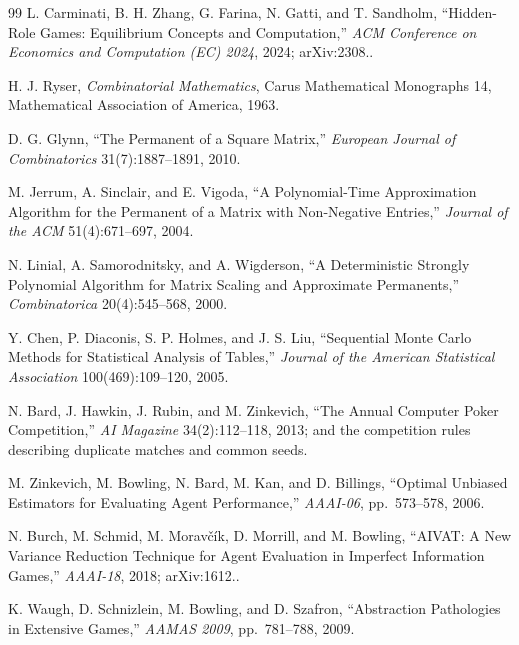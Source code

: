 \begin{thebibliography}{99}
L. Carminati, B. H. Zhang, G. Farina, N. Gatti, and T. Sandholm, ``Hidden-Role
Games: Equilibrium Concepts and Computation,'' \emph{ACM Conference on Economics
and Computation (EC) 2024}, 2024; arXiv:2308..

H. J. Ryser, \emph{Combinatorial Mathematics}, Carus Mathematical Monographs 14,
Mathematical Association of America, 1963.

D. G. Glynn, ``The Permanent of a Square Matrix,'' \emph{European Journal of
Combinatorics} 31(7):1887--1891, 2010.

M. Jerrum, A. Sinclair, and E. Vigoda, ``A Polynomial-Time Approximation
Algorithm for the Permanent of a Matrix with Non-Negative Entries,''
\emph{Journal of the ACM} 51(4):671--697, 2004.

N. Linial, A. Samorodnitsky, and A. Wigderson, ``A Deterministic Strongly
Polynomial Algorithm for Matrix Scaling and Approximate Permanents,''
\emph{Combinatorica} 20(4):545--568, 2000.

Y. Chen, P. Diaconis, S. P. Holmes, and J. S. Liu, ``Sequential Monte Carlo
Methods for Statistical Analysis of Tables,'' \emph{Journal of the American
Statistical Association} 100(469):109--120, 2005.


N. Bard, J. Hawkin, J. Rubin, and M. Zinkevich, ``The Annual Computer Poker
Competition,'' \emph{AI Magazine} 34(2):112--118, 2013; and the competition
rules describing duplicate matches and common seeds.

M. Zinkevich, M. Bowling, N. Bard, M. Kan, and D. Billings, ``Optimal Unbiased
Estimators for Evaluating Agent Performance,'' \emph{AAAI-06}, pp.~573--578,
2006.

N. Burch, M. Schmid, M. Morav\v{c}\'ik, D. Morrill, and M. Bowling, ``AIVAT: A
New Variance Reduction Technique for Agent Evaluation in Imperfect Information
Games,'' \emph{AAAI-18}, 2018; arXiv:1612..

K. Waugh, D. Schnizlein, M. Bowling, and D. Szafron, ``Abstraction Pathologies
in Extensive Games,'' \emph{AAMAS 2009}, pp.~781--788, 2009.


\end{thebibliography}
